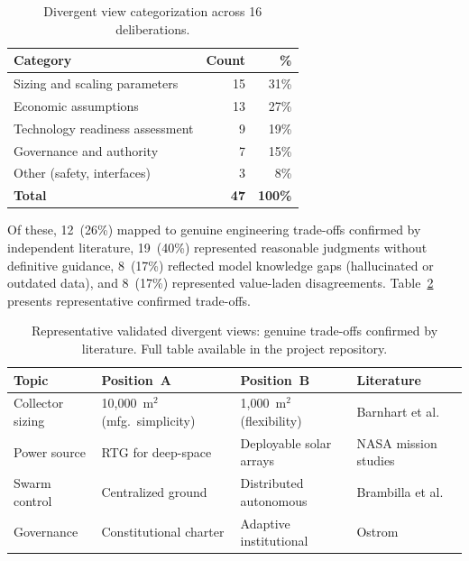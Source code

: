 \documentclass[11pt,a4paper]{article}
\begin{document}
\begin{table}[ht]
\centering
\caption{Divergent view categorization across 16 deliberations.}
\label{tab:divergent}
\begin{tabular}{@{}lrr@{}}
\toprule
\textbf{Category} & \textbf{Count} & \textbf{\%} \\
\midrule
Sizing and scaling parameters & 15 & 31\% \\
Economic assumptions & 13 & 27\% \\
Technology readiness assessment & 9 & 19\% \\
Governance and authority & 7 & 15\% \\
Other (safety, interfaces) & 3 & 8\% \\
\midrule
\textbf{Total} & \textbf{47} & \textbf{100\%} \\
\bottomrule
\end{tabular}
\end{table}

Of these, 12~(26\%) mapped to genuine engineering trade-offs confirmed by independent literature, 19~(40\%) represented reasonable judgments without definitive guidance, 8~(17\%) reflected model knowledge gaps (hallucinated or outdated data), and 8~(17\%) represented value-laden disagreements. Table~\ref{tab:validated_divergent} presents representative confirmed trade-offs.

\begin{table}[ht]
\centering
\caption{Representative validated divergent views: genuine trade-offs confirmed by literature. Full table available in the project repository.}
\label{tab:validated_divergent}
\begin{tabular}{@{}p{2.2cm}p{3.2cm}p{3.2cm}p{4cm}@{}}
\toprule
\textbf{Topic} & \textbf{Position~A} & \textbf{Position~B} & \textbf{Literature} \\
\midrule
Collector sizing & 10{,}000~m$^2$ (mfg.\ simplicity) & 1{,}000~m$^2$ (flexibility) & Barnhart et al.~\cite{barnhart2007smallsat} \\
Power source & RTG for deep-space & Deployable solar arrays & NASA mission studies~\cite{nasa2020se} \\
Swarm control & Centralized ground & Distributed autonomous & Brambilla et al.~\cite{brambilla2013swarm} \\
Governance & Constitutional charter & Adaptive institutional & Ostrom~\cite{ostrom1990governing} \\
\bottomrule
\end{tabular}
\end{table}
\end{document}
